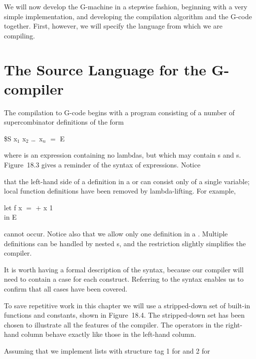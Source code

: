 We will now develop the G-machine in a stepwise fashion, beginning with a
very simple implementation, and developing the compilation algorithm and
the G-code together. First, however, we will specify the language from which
we are compiling.

\section{The Source Language for the G-compiler}

The compilation to G-code begins with a program consisting of a number of
supercombinator definitions of the form

\begin{mlcoded}
    \$S x$_1$ x$_2$ \ldots\ x$_n$ $=$ E
\end{mlcoded}

\noindent
where  is an expression containing no lambdas, but which may contain s
and s. Figure~18.3 gives a reminder of the syntax of expressions. Notice


\noindent
that the left-hand side of a definition in a  or  can consist only of a
single variable; local function definitions have been removed by lambda-lifting. For example,

\begin{mlcoded}
    let f x $=$ $+$ x 1 \\
    in E
\end{mlcoded}

\noindent
cannot occur. Notice also that we allow only one definition in a . Multiple
definitions can be handled by nested s, and the restriction slightly simplifies
the compiler.

It is worth having a formal description of the syntax, because our compiler
will need to contain a case for each construct. Referring to the syntax enables
us to confirm that all cases have been covered.

To save repetitive work in this chapter we will use a stripped-down set of
built-in functions and constants, shown in Figure~18.4. The stripped-down set
has been chosen to illustrate all the features of the compiler. The operators in
the right-hand column behave exactly like those in the left-hand column.

Assuming that we implement lists with structure tag 1 for  and 2 for